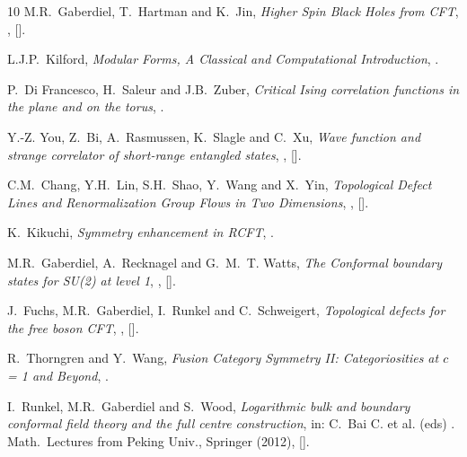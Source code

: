\begin{thebibliography}{10}
M.R.~Gaberdiel, T.~Hartman and K.~Jin,
\textit{Higher Spin Black Holes from CFT},
,
[].

L.J.P.~Kilford,
\textit{Modular Forms, A Classical and Computational Introduction},
.

P.~Di Francesco, H.~Saleur and J.B.~Zuber,
\textit{Critical Ising correlation functions in the plane and on the torus},
.

Y.-Z. You, Z.~Bi, A.~Rasmussen, K.~Slagle and C.~Xu,
\textit{Wave function and strange correlator of short-range entangled states},
,
[].

C.M.~Chang, Y.H.~Lin, S.H.~Shao, Y.~Wang and X.~Yin,
\textit{Topological Defect Lines and Renormalization Group Flows in Two Dimensions},
,
[].

K.~Kikuchi,
\textit{Symmetry enhancement in RCFT},
.

M.R.~Gaberdiel, A.~Recknagel and G.~M.~T. Watts,
\textit{The Conformal boundary states for SU(2) at level 1},
,
[].

J.~Fuchs, M.R.~Gaberdiel, I.~Runkel and C.~Schweigert,
\textit{Topological defects for the free boson CFT},
,
[].

R.~Thorngren and Y.~Wang,
\textit{Fusion Category Symmetry II: Categoriosities at $c$ = 1 and Beyond}, .

I.~Runkel, M.R.~Gaberdiel and S.~Wood,
\textit{Logarithmic bulk and boundary conformal field theory and the
  full centre construction},
in: C.~Bai C. et al. (eds) . Math.\ Lectures from Peking Univ., Springer (2012),
[\arxiv{1201.6273}{1201.6273 [hep-th}].


\end{thebibliography}
